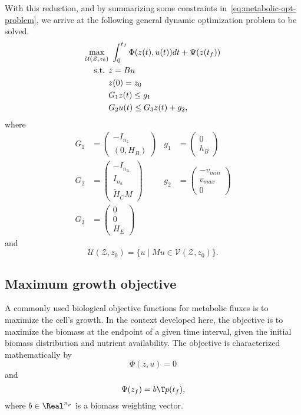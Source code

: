 \documentclass[a4paper,11pt,DIV12]{scrartcl}
\theoremstyle{remark}
\renewcommand{\matrix}[1]{\begin{pmatrix}#1\end{pmatrix}}
\begin{document}
With this reduction, and by summarizing some constraints in~\eqref{eq:metabolic-opt-problem}, we arrive at the following general dynamic optimization problem to be solved.
\begin{equation}
  \label{eq:generic-opt-problem}
  \begin{aligned}
    \max_{\mathcal U(\mathcal Z,z_0)} &\ \int_{0}^{t_f} \Phi(z(t),u(t)) dt + \Psi(z(t_f)) \\
    \textnormal{s.t. } & \dot z = B u \\
    & z(0) = z_0 \\
    & G_1 z(t) \leq g_1 \\
    & G_2 u(t) \leq G_3 z(t) + g_2,
  \end{aligned}
\end{equation}
where
\begin{equation}
  \label{eq:opt-constraints}
  \begin{aligned}
    G_1 &= \matrix{-I_{n_z} \\ (0, H_B)}   &  g_1 &= \matrix{0\\h_B} \\    
    G_2 &= \matrix{-I_{n_u} \\ I_{n_u} \\ \tilde H_C M}              &  g_2 &= \matrix{-v_{min}\\v_{max}\\0} \\
    G_3 &= \matrix{0 \\ 0 \\ H_E}            &
  \end{aligned}
\end{equation}
and
\begin{equation}
  \label{eq:valid-input-set}
  \mathcal U(\mathcal Z, z_0) = \{ u \mid Mu \in \mathcal{V}(\mathcal Z, z_0) \}.
\end{equation}

\subsection{Maximum growth objective}
\label{sec:maxim-growth-object}

A commonly used biological objective functions for metabolic fluxes is to maximize the cell's growth.
In the context developed here, the objective is to maximize the biomass at the endpoint of a given time interval, given the initial biomass distribution and nutrient availability.
The objective is characterized mathematically by
\begin{equation}
  \label{eq:maxgrowth-phi-objective}
  \Phi(z,u) = 0
\end{equation}
and
\begin{equation}
  \label{eq:maxgrowth-psi-objective}
  \Psi(z_f) = b\T p(t_f),
\end{equation}
where $b \in \Real^{n_p}$ is a biomass weighting vector.
\end{document}
